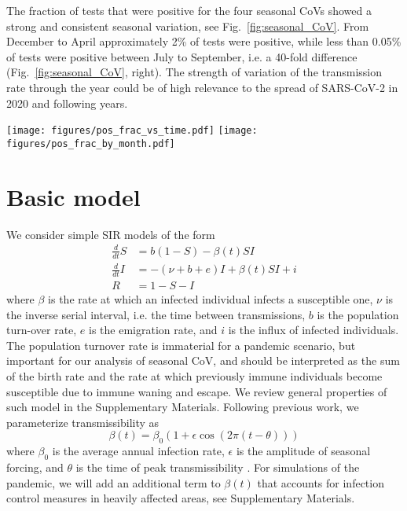 \documentclass[rmp, reprint, superscriptaddress, floatfix,amsmath]{revtex4-1}
\newcommand{\Jan}[1]{{\color{deepsaffron}Jan: #1}}
\newcommand{\Emma}[1]{{\color{purple}Emma: #1}}
\begin{document}
The fraction of tests that were positive for the four seasonal CoVs showed a strong and consistent seasonal variation, see Fig.~\ref{fig:seasonal_CoV}. 
From December to April approximately 2\%  of tests were positive, while less than 0.05\% of tests were positive between July to September, i.e. a 40-fold difference (Fig.~\ref{fig:seasonal_CoV}, right).
The strength of variation of the transmission rate through the year could be of high relevance to the spread of SARS-CoV-2 in 2020 and following years. 

\begin{figure*}
    \centering
    \texttt{[image: figures/pos\_frac\_vs\_time.pdf]}
    \texttt{[image: figures/pos\_frac\_by\_month.pdf]}
    \caption{{\bf Seasonal variation in the fraction of positive CoV tests in Stockholm, Sweden.} The left panel shows test results between 2010 and 2019. The right panel shows aggregated data for all years. All CoVs show a marked decline in summer and autumn, with HKU1/OC43 peaking January--December, and NL63 and 229E peaking in February--March. %
    }
    \label{fig:seasonal_CoV}
\end{figure*}

\section{Basic model}
We consider simple SIR models of the form \citep{kermack_contributions_1991}
\begin{equation}
\begin{split}
\frac{d}{dt} S & = b(1-S) - \beta(t) S I \\
\frac{d}{dt} I & = -(\nu+b+e) I + \beta(t) S I + i\\
R & = 1-S-I
\end{split}
\label{eq:SIR}
\end{equation}
where $\beta$ is the rate at which an infected individual infects a susceptible one, $\nu$ is the inverse serial interval, i.e. the time between transmissions, $b$ is the population turn-over rate, $e$ is the emigration rate, and $i$ is the influx of infected individuals.
The population turnover rate is immaterial for a pandemic scenario, but important for our analysis of seasonal CoV, and should be interpreted as the sum of the birth rate and the rate at which previously immune individuals become susceptible due to immune waning and escape.
We review general properties of such model in the Supplementary Materials. 
Following previous work, we parameterize transmissibility as 
\begin{equation}
\beta(t) = \beta_0\left(1+\epsilon\cos(2\pi (t-\theta))\right)
\label{eq:transmissibility}
\end{equation}
where $\beta_0$ is the average annual infection rate, $\epsilon$ is the amplitude of seasonal forcing, and $\theta$ is the time of peak transmissibility \citep{dushoff_dynamical_2004,chen_regular_2017}.
For simulations of the pandemic, we will add an additional term to $\beta(t)$ that accounts for infection control measures in heavily affected areas, see Supplementary Materials.
\end{document}
